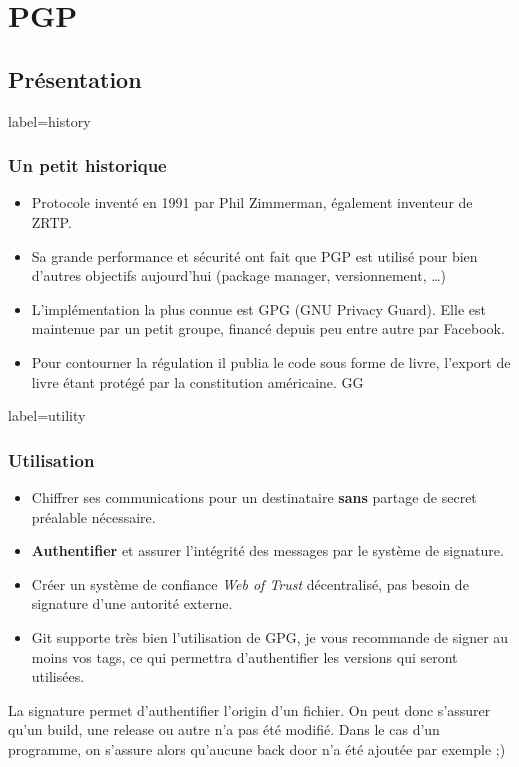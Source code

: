 \documentclass{beamer}
\begin{document}
    \section{PGP}
    \subsection{Présentation}
        \begin{frame}{label=history}
            \frametitle{Un petit historique}
            \begin{center}
                \begin{itemize}
                    \item Protocole inventé en 1991 par Phil Zimmerman, également inventeur de ZRTP.
                    \item Sa grande performance et sécurité ont fait que PGP est utilisé pour bien d'autres objectifs aujourd'hui (package manager, versionnement, \ldots)
                    \item L'implémentation la plus connue est GPG (GNU Privacy Guard). Elle est maintenue par un petit groupe, financé depuis peu entre autre par Facebook.
                    \item Pour contourner la régulation il publia le code sous forme de livre, l'export de livre étant protégé par la constitution américaine. GG
                \end{itemize}
            \end{center}
        \end{frame}
        \begin{frame}{label=utility}
            \frametitle{Utilisation}
            \begin{center}
                \begin{itemize}
                    \item Chiffrer ses communications pour un destinataire \textbf{sans} partage de secret préalable nécessaire.
                    \item \textbf{Authentifier} et assurer l'intégrité des messages par le système de signature.
                    \item Créer un système de confiance \textit{Web of Trust} décentralisé, pas besoin de signature d'une autorité externe.
                    \item Git supporte très bien l'utilisation de GPG, je vous recommande de signer au moins vos tags, ce qui permettra d'authentifier les versions qui seront utilisées.
                \end{itemize}
                \begin{tcolorbox}[colback=green!5,colframe=green!40!black,title=Pourquoi authentifier ?]
                    La signature permet d'authentifier l'origin d'un fichier. On peut donc s'assurer qu'un build, une release ou autre n'a pas été modifié.
                    Dans le cas d'un programme, on s'assure alors qu'aucune back door n'a été ajoutée par exemple ;)
                \end{tcolorbox}
            \end{center}
        \end{frame}
\end{document}

